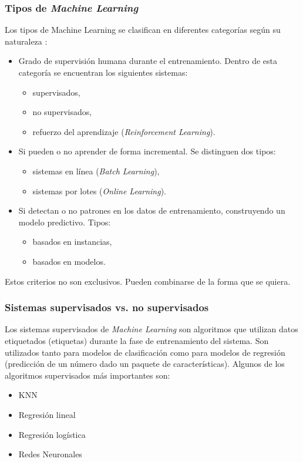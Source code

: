 \documentclass[12pt,a4paper]{article}
\begin{document}
\subsubsection{Tipos de \textit{Machine Learning}}
Los tipos de Machine Learning se clasifican en diferentes categorías según su naturaleza \cite{geron2022hands}:
\begin{itemize}
	\item Grado de supervisión humana durante el entrenamiento. Dentro de esta categoría se encuentran los siguientes sistemas:
	\begin{itemize}
		\item supervisados,
		\item no supervisados,
		\item refuerzo del aprendizaje (\textit{Reinforcement Learning}).
	\end{itemize}
	\item Si pueden o no aprender de forma incremental. Se distinguen dos tipos:
	\begin{itemize}
		\item sistemas en línea (\textit{Batch Learning}),
		\item sistemas por lotes (\textit{Online Learning}).
	\end{itemize}
	\item Si detectan o no patrones en los datos de entrenamiento, construyendo un modelo predictivo. Tipos:
	\begin{itemize}
		\item basados en instancias,
		\item basados en modelos.
	\end{itemize}
\end{itemize}

Estos criterios no son exclusivos. Pueden combinarse de la forma que se quiera.

\subsubsection{Sistemas supervisados vs. no supervisados}
Los sistemas supervisados de \textit{Machine Learning} son algoritmos que utilizan datos etiquetados (etiquetas) durante la fase de entrenamiento del sistema. Son utilizados tanto para modelos de clasificación como para modelos de regresión (predicción de un número dado un paquete de características). Algunos de los algoritmos supervisados más importantes son:
\begin{itemize}
	\item KNN 
	\item Regresión lineal
	\item Regresión logística
	\item Redes Neuronales	
\end{itemize}
\end{document}
